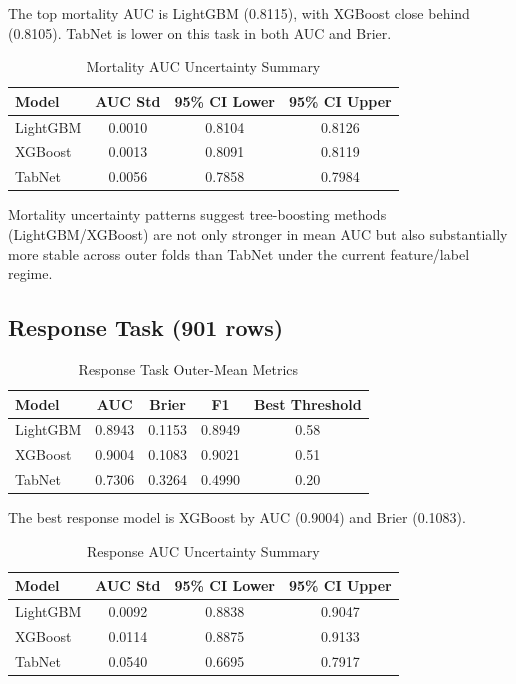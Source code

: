 \documentclass[journal]{IEEEtran}
\begin{document}
The top mortality AUC is LightGBM (0.8115), with XGBoost close behind (0.8105). TabNet is lower on this task in both AUC and Brier.

\begin{table}[htbp]
\caption{Mortality AUC Uncertainty Summary}
\label{tab:mortality_ci}
\centering
\small
\begin{tabular}{lccc}
\toprule
Model & AUC Std & 95\% CI Lower & 95\% CI Upper \\
\midrule
LightGBM & 0.0010 & 0.8104 & 0.8126 \\
XGBoost & 0.0013 & 0.8091 & 0.8119 \\
TabNet & 0.0056 & 0.7858 & 0.7984 \\
\bottomrule
\end{tabular}
\end{table}

Mortality uncertainty patterns suggest tree-boosting methods (LightGBM/XGBoost) are not only stronger in mean AUC but also substantially more stable across outer folds than TabNet under the current feature/label regime.

\subsection{Response Task (901 rows)}
\begin{table}[htbp]
\caption{Response Task Outer-Mean Metrics}
\label{tab:response}
\centering
\small
\begin{tabular}{lcccc}
\toprule
Model & AUC & Brier & F1 & Best Threshold \\
\midrule
LightGBM & 0.8943 & 0.1153 & 0.8949 & 0.58 \\
XGBoost & 0.9004 & 0.1083 & 0.9021 & 0.51 \\
TabNet & 0.7306 & 0.3264 & 0.4990 & 0.20 \\
\bottomrule
\end{tabular}
\end{table}

The best response model is XGBoost by AUC (0.9004) and Brier (0.1083).

\begin{table}[htbp]
\caption{Response AUC Uncertainty Summary}
\label{tab:response_ci}
\centering
\small
\begin{tabular}{lccc}
\toprule
Model & AUC Std & 95\% CI Lower & 95\% CI Upper \\
\midrule
LightGBM & 0.0092 & 0.8838 & 0.9047 \\
XGBoost & 0.0114 & 0.8875 & 0.9133 \\
TabNet & 0.0540 & 0.6695 & 0.7917 \\
\bottomrule
\end{tabular}
\end{table}
\end{document}
